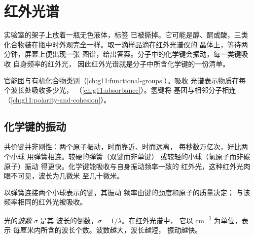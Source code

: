 \chapter{红外光谱}\label{ch:g11:infrared}

实验室的架子上放着一瓶无色液体，标签
已被撕掉。它可能是醇、酮或酸，三类
化合物装在瓶中时外观完全一样。取一滴样品滴在红外光谱仪的
晶体上，等待两分钟，屏幕上便出现一张
图谱，给出答案。分子中的化学键会振动，每一类键吸收
自身频率的红外光，
因此红外光谱就是分子中所含化学键的一份清单。

\begin{recall}
官能团与有机化合物类别（\cref{ch:g11:functional-groups}）。吸收
光谱表示物质在每个波长处吸收多少光，
（\cref{ch:g11:absorbance}）。氢键将 
基团与相邻分子相连（\cref{ch:g11:polarity-and-cohesion}）。
\end{recall}

\section{化学键的振动}

共价键并非刚性：两个原子振动，时而靠近、时而远离，
每秒数万亿次，好比两个小球
用弹簧相连。较硬的弹簧（双键而非单键）
或较轻的小球（氢原子而非碳原子）振动
得更快。化学键能吸收与自身振动频率一致的
红外光，这种红外光肉眼不可见，波长为几微米
至几十微米。

\begin{omfigure}

{\small 以弹簧连接两个小球表示的键，其振动
频率由键的劲度和原子的质量决定；
与该频率相同的红外光被吸收。}
\end{omfigure}

\begin{definition}[波数]\label{def:g11:infrared:wavenumber}
光的\emph{波数} $\sigma$ 是其
波长的倒数，$\sigma = 1/\lambda$。在红外光谱中，
它以 \si{cm^{-1}} 为单位，表示
每厘米内所含的波长个数。波数越大，波长越短，
振动越快。
\end{definition}

